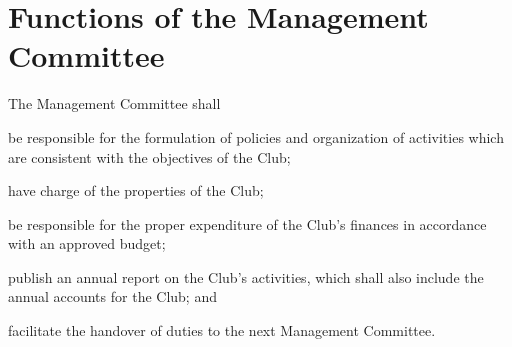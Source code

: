 \section{Functions of the Management Committee}
The Management Committee shall
	\begin{legal}
	\item be responsible for the formulation of policies and organization of activities which are consistent with the objectives of the Club;
	\item have charge of the properties of the Club;
	\item be responsible for the proper expenditure of the Club's finances in accordance with an approved budget;
	\item publish an annual report on the Club's activities, which shall also include the annual accounts for the Club; and
	\item facilitate the handover of duties to the next Management Committee.
	\end{legal}

